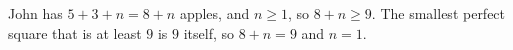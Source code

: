 John has $5+3+n=8+n$ apples, and $n\ge1$, so $8+n\ge9$. The smallest perfect square that is at least $9$ is $9$ itself, so $8+n=9$ and $n=\boxed{1}$.
